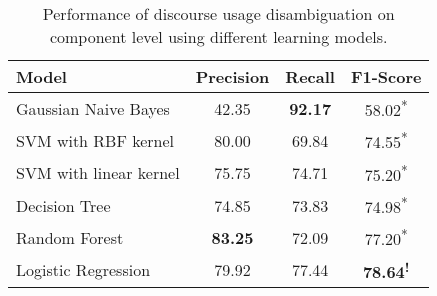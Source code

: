 \begin{table}[ht]
\centering
\begin{tabular}{|l|c|c|c|}
\hline

Model                  &     Precision &     Recall &     F1-Score                 \\ \hline
Gaussian Naive Bayes   &     42.35     & \bf 92.17  &     58.02\textsuperscript{*} \\ \hline
SVM with RBF kernel    &     80.00     &     69.84  &     74.55\textsuperscript{*} \\ \hline
SVM with linear kernel &     75.75     &     74.71  &     75.20\textsuperscript{*} \\ \hline
Decision Tree          &     74.85     &     73.83  &     74.98\textsuperscript{*} \\ \hline
Random Forest          & \bf 83.25     &     72.09  &     77.20\textsuperscript{*} \\ \hline
Logistic Regression    &     79.92     &     77.44  & \bf 78.64\textsuperscript{!} \\ \hline

\end{tabular}
\caption{\label{t:recognition-models} Performance of discourse usage
disambiguation on component level using different learning models. }
\end{table}
